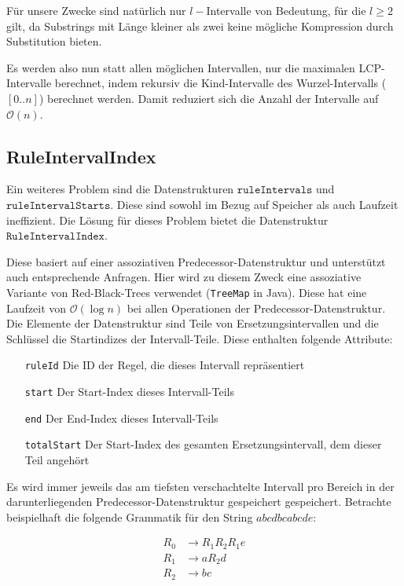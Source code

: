 Für unsere Zwecke sind natürlich nur $l-$Intervalle von Bedeutung, für die $l \geq 2$ gilt, da Substrings mit Länge kleiner als zwei keine mögliche Kompression durch Substitution bieten.

Es werden also nun statt allen möglichen Intervallen, nur die maximalen LCP-Intervalle berechnet, indem rekursiv die Kind-Intervalle des Wurzel-Intervalls ($[0..n]$) berechnet werden. Damit reduziert sich die Anzahl der Intervalle auf $\mathcal{O}(n)$.

\subsection{RuleIntervalIndex}

Ein weiteres Problem sind die Datenstrukturen $\texttt{ruleIntervals}$ und $\texttt{ruleIntervalStarts}$. Diese sind sowohl im Bezug auf Speicher als auch Laufzeit ineffizient. Die Lösung für dieses Problem bietet die Datenstruktur $\texttt{RuleIntervalIndex}$.

Diese basiert auf einer assoziativen Predecessor-Datenstruktur \cite{dinklage_engineering_2021} und unterstützt auch entsprechende Anfragen. Hier wird zu diesem Zweck eine assoziative Variante von Red-Black-Trees \cite{bayer_symmetric_1972, guibas_dichromatic_1978} verwendet (\texttt{TreeMap} in Java). Diese hat eine Laufzeit von $\mathcal{O}(\log n)$ bei allen Operationen der Predecessor-Datenstruktur. Die Elemente der Datenstruktur sind Teile von Ersetzungsintervallen und die Schlüssel die Startindizes der Intervall-Teile. Diese enthalten folgende Attribute:
\begin{itemize}[leftmargin=2.5cm]
	\item[\texttt{ruleId}] Die ID der Regel, die dieses Intervall repräsentiert
	\item[\texttt{start}] Der Start-Index dieses Intervall-Teils
	\item[\texttt{end}] Der End-Index dieses Intervall-Teils
	\item[\texttt{totalStart}] Der Start-Index des gesamten Ersetzungsintervall, dem dieser Teil angehört
\end{itemize}


Es wird immer jeweils das am tiefsten verschachtelte Intervall pro Bereich in der darunterliegenden Predecessor-Datenstruktur gespeichert gespeichert. Betrachte beispielhaft die folgende Grammatik für den String $abcdbcabcde$:

\begin{align*}
	R_0 &\rightarrow R_1 R_2 R_1 e\\
	R_1 &\rightarrow a R_2 d\\
	R_2 &\rightarrow bc
\end{align*}

